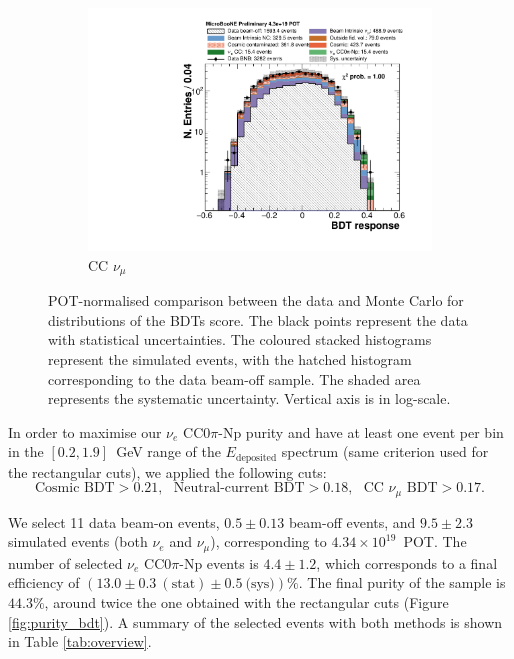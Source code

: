 \begin{figure}[htbp]
\begin{subfigure}{0.32\textwidth}
    \includegraphics[width=\linewidth]{figures/bdt_numu.pdf}
    \caption{CC $\nu_{\mu}$} 
  \end{subfigure}
  \caption{POT-normalised comparison between the data and Monte Carlo for distributions of the BDTs score. The black points represent the data with statistical uncertainties. The coloured stacked histograms represent the simulated events, with the hatched histogram corresponding to the data beam-off sample. The shaded area represents the systematic uncertainty. Vertical axis is in log-scale.}\label{fig:bdt_datamc}
\end{figure}

In order to maximise our $\nu_e$ CC0$\pi$-Np purity and have at least one event per bin in the $[0.2,1.9]$~GeV range of the $E_{\mathrm{deposited}}$ spectrum (same criterion used for the rectangular cuts), we applied the following cuts:
\begin{equation}
    \text{Cosmic BDT} > 0.21,~~~\text{Neutral-current BDT} > 0.18,~~~\text{CC }\nu_{\mu}\text{ BDT} > 0.17.
\end{equation}

We select 11 data beam-on events, $0.5\pm0.13$ beam-off events, and $9.5\pm2.3$ simulated events (both $\nu_e$ and $\nu_{\mu}$), corresponding to $4.34\times10^{19}$~POT. The number of selected $\nu_e$ CC0$\pi$-Np events is $4.4\pm1.2$, which corresponds to a final efficiency of $(13.0\pm0.3~\mathrm{(stat)}\pm0.5~\text{(sys)})\%$. The final purity of the sample is $44.3\%$, around twice the one obtained with the rectangular cuts (Figure \ref{fig:purity_bdt}).
A summary of the selected events with both methods is shown in Table \ref{tab:overview}.

